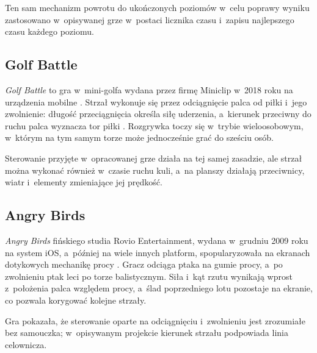 Ten sam mechanizm powrotu do ukończonych poziomów w~celu poprawy wyniku zastosowano
w~opisywanej grze w~postaci licznika czasu i~zapisu najlepszego czasu każdego poziomu.

\subsection{Golf Battle}

\emph{Golf Battle} to gra w~mini-golfa wydana przez firmę Miniclip w~2018 roku na
urządzenia mobilne \cite{gra-golf}. Strzał wykonuje się przez odciągnięcie palca od
piłki i~jego zwolnienie: długość przeciągnięcia określa siłę uderzenia, a~kierunek
przeciwny do ruchu palca wyznacza tor piłki \cite{gra-golf-recenzja}. Rozgrywka toczy się
w~trybie wieloosobowym, w~którym na tym samym torze może jednocześnie grać do sześciu
osób.

Sterowanie przyjęte w~opracowanej grze działa na tej samej zasadzie, ale strzał można
wykonać również w~czasie ruchu kuli, a~na planszy działają przeciwnicy, wiatr i~elementy
zmieniające jej prędkość.

\subsection{Angry Birds}

\emph{Angry Birds} fińskiego studia Rovio Entertainment, wydana w~grudniu 2009 roku na
system iOS, a~później na wiele innych platform, spopularyzowała na ekranach dotykowych
mechanikę procy \cite{gra-ab}. Gracz odciąga ptaka na gumie procy,
a~po zwolnieniu ptak leci po torze balistycznym. Siła i~kąt rzutu wynikają wprost
z~położenia palca względem procy, a~ślad poprzedniego lotu pozostaje na ekranie, co
pozwala korygować kolejne strzały.

Gra pokazała, że sterowanie oparte na odciągnięciu i~zwolnieniu jest zrozumiałe bez
samouczka; w~opisywanym projekcie kierunek strzału podpowiada linia celownicza.

